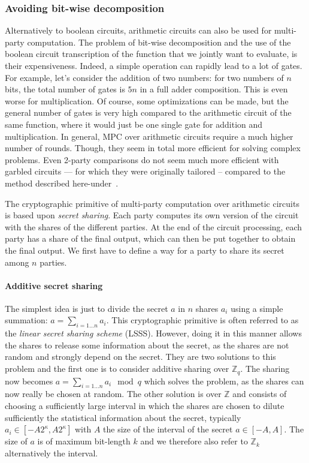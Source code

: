 \subsubsection{Avoiding bit-wise decomposition}
Alternatively to boolean circuits, arithmetic circuits can also be used for multi-party computation. The problem of bit-wise decomposition and the use of the boolean circuit transcription of the function that we jointly want to evaluate, is their expensiveness. Indeed, a simple operation can rapidly lead to a lot of gates. For example, let's consider the addition of two numbers: for two numbers of $n$ bits, the total number of gates is $5n$ in a full adder composition. This is even worse for multiplication. Of course, some optimizations can be made, but the general number of gates is very high compared to the arithmetic circuit of the same function, where it would just be one single gate for addition and multiplication. In general, MPC over arithmetic circuits require a much higher number of rounds. Though, they seem in total more efficient for solving complex problems. Even 2-party comparisons do not seem much more efficient with garbled circuits --- for which they were originally tailored -- compared to the method described here-under~\cite{Blom2014AThesis}.

The cryptographic primitive of multi-party computation over arithmetic circuits is based upon \emph{secret sharing}. Each party computes its own version of the circuit with the shares of the different parties. At the end of the circuit processing, each party has a share of the final output, which can then be put together to obtain the final output. We first have to define a way for a party to share its secret among $n$ parties.

\paragraph{Additive secret sharing}
The simplest idea is just to divide the secret $a$ in $n$ shares $a_i$ using a simple summation: $a = \sum_{i=1 \ldots n}a_i$. This cryptographic primitive is often referred to as the \emph{linear secret sharing scheme} (LSSS). However, doing it in this manner allows the shares to release some information about the secret, as the shares are not random and strongly depend on the secret. They are two solutions to this problem and the first one is to consider additive sharing over $\mathbb{Z}_q$. The sharing now becomes $a = \sum_{i=1\ldots n}a_i \mod q$ which solves the problem, as the shares can now really be chosen at random. The other solution is over $\mathbb{Z}$ and consists of choosing a sufficiently large interval in which the shares are chosen to dilute sufficiently the statistical information about the secret, typically $a_i \in \left[-A2^\kappa,A2^\kappa\right]$ with $A$ the size of the interval of the secret $a \in \left[-A,A\right]$. The size of $a$ is of maximum bit-length $k$ and we therefore also refer to $\mathbb{Z}_k$ alternatively the interval.

